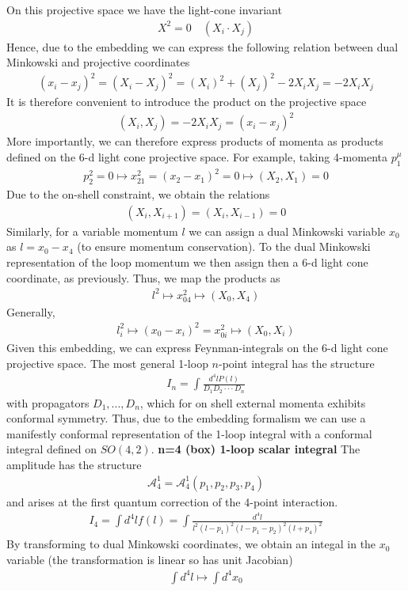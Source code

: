 \documentclass[12pt]{scrartcl}
\begin{document}
{On this projective space we have the light-cone invariant 
\begin{align}
    X^2=0 \quad (X_{i}\cdot X_{j})
\end{align}
Hence, due to the embedding we can express the following relation between dual Minkowski and projective coordinates
\begin{align}
    (x_i - x_j)^2 = (X_i - X_j)^2 = (X_i)^2 + (X_j)^2 - 2X_iX_j = - 2X_iX_j
\end{align}
It is therefore convenient to introduce the product on the projective space
\begin{align}
    (X_i,X_j) = - 2X_iX_j = (x_i - x_j)^2 
\end{align}
More importantly, we can therefore express products of momenta as products defined on the 6-d light cone projective space. For example, taking 4-momenta $p_1^{\mu}$
\begin{align}
    p_2^2 = 0 \mapsto x_{21}^2 = (x_2 -x_1)^2 = 0 \mapsto (X_2,X_1) = 0
\end{align}
Due to the on-shell constraint, we obtain the relations
\begin{align}
    (X_i,X_{i+1}) = (X_i,X_{i-1}) = 0
\end{align}
Similarly, for a variable momentum $l$ we can assign a dual Minkowski variable $x_0$ as $l = x_0 - x_4$ (to ensure momentum conservation). To the dual Minkowski representation of the loop momentum we then assign then a 6-d light cone coordinate, as previously. Thus, we map the products as
\begin{align}
    l^2 \mapsto x_{04}^2 \mapsto (X_0,X_4)
\end{align}
Generally, 
\begin{align}
    l_i^2 \mapsto (x_0 - x_i)^2 = x_{0i}^2 \mapsto (X_0,X_i)
\end{align}
Given this embedding, we can express Feynman-integrals on the 6-d light cone projective space. The most general 1-loop $n$-point integral has the structure
\begin{align}
    I_n = \int \frac{d^4l P(l)}{D_1D_2\cdot \cdot\cdot D_n}
\end{align}
with propagators $D_1,...,D_n$, which for on shell external momenta exhibits conformal symmetry. Thus, due to the embedding formalism we can use a manifestly conformal representation of the 1-loop integral with a conformal integral defined on $SO(4,2)$. \newline
\newline
\textbf{n=4 (box) 1-loop scalar integral}
The amplitude has the structure 
\begin{align}
    \mathcal{A}_4^1 = \mathcal{A}_4^1(p_1,p_2,p_3,p_4)
\end{align}
and arises at the first quantum correction of the 4-point interaction.
\begin{align}
    I_4 = \int d^4l f(l) =  \int \frac{d^4l}{l^2(l-p_1)^2(l-p_1-p_2)^2(l+p_4)^2}
\end{align}
By transforming to dual Minkowski coordinates, we obtain an integal in the $x_0$ variable (the transformation is linear so has unit Jacobian)
\begin{align}
    \int d^4l \mapsto \int d^4x_0  
\end{align}

}
\end{document}
